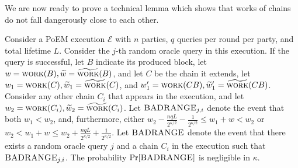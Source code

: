 We are now ready to prove a technical lemma which shows that works
of chains do not fall dangerously close to each other.

\begin{lemma}\label{lem:good-ranges}
  Consider a PoEM execution $\mathcal{E}$ with $n$ parties, $q$ queries per round per party,
  and total lifetime $L$.
  Consider the $j$-th random oracle query in this execution.
  If the query is successful, let $B$ indicate its produced block, let
  $w = \textsc{work}(B), \widetilde{w} = \widetilde{\textsc{work}}(B)$, and let $C$ be the
  chain it extends, let $w_1 = \textsc{work}(C), \widetilde{w}_1 = \widetilde{\textsc{work}}(C)$, and
  $w_1' = \textsc{work}(CB), \widetilde{w}_1' = \widetilde{\textsc{work}}(CB)$. Consider any other chain $C_i$ that appears in the
  execution, and let $w_2 = \textsc{work}(C_i), \widetilde{w}_2 = \widetilde{\textsc{work}}(C_i)$.
  Let $\textsc{BADRANGE}_{j,i}$ denote the event that both
  $w_1 < w_2$, and, furthermore, either
  $w_2 - \frac{nqL}{2^{\kappa/2}} - \frac{1}{2^{\kappa/2}} \leq w_1 + w < w_2$ or
  $w_2 < w_1 + w \leq w_2 + \frac{nqL}{2^{\kappa/2}} + \frac{1}{2^{\kappa/2}}$.
  Let $\textsc{BADRANGE}$ denote the event that there exists a random oracle query $j$
  and a chain $C_i$ in the execution such that $\textsc{BADRANGE}_{j,i}$.
  The probability $\Pr[\textsc{BADRANGE}]$ is negligible in $\kappa$.
\end{lemma}
